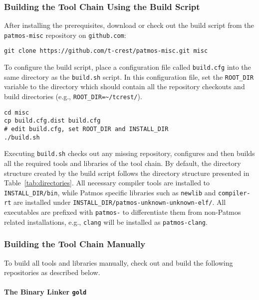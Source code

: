 \subsubsection{Building the Tool Chain Using the Build Script}
\label{sec:buildscript}

After installing the prerequisites, download or check out the build script 
from the \texttt{patmos-misc} repository on \texttt{github.com}:

\begin{verbatim}
git clone https://github.com/t-crest/patmos-misc.git misc
\end{verbatim}

To configure the build script, place a configuration file called \texttt{build.cfg}
into the same directory as the \texttt{build.sh} script. 
In this configuration file, set the \texttt{ROOT\_DIR} variable to the directory which should contain all
the repository checkouts and build directories (e.g., \texttt{ROOT\_DIR=\textasciitilde/tcrest/}).

\begin{verbatim}
cd misc
cp build.cfg.dist build.cfg
# edit build.cfg, set ROOT_DIR and INSTALL_DIR
./build.sh
\end{verbatim}

Executing \texttt{build.sh} checks out any missing repository, configures and then builds
all the required tools and libraries of the tool chain. 
By default, the directory structure created by the build script follows the directory structure presented in Table~\ref{tab:directories}. 
All necessary compiler tools are installed to 
\texttt{INSTALL\_DIR/bin}, while Patmos specific libraries such as \texttt{newlib} and 
\texttt{compiler-rt} are installed under \texttt{INSTALL\_DIR/patmos-unknown-unknown-elf/}.
All executables are prefixed with \texttt{patmos-} to differentiate them from non-Patmos related
installations, e.g., \texttt{clang} will be installed as \texttt{patmos-clang}.


\subsubsection{Building the Tool Chain Manually}
\label{sec:manual_build}

To build all tools and libraries manually, check out and build the following repositories as described below.

\paragraph{The Binary Linker \texttt{gold}} \hfill\\


